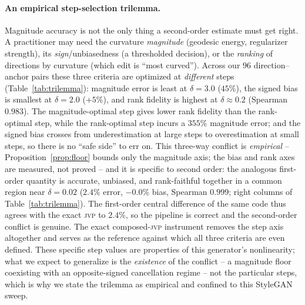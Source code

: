 \documentclass[10pt]{article}
\newcommand{\jvp}{\textsc{jvp}}
\begin{document}
\paragraph{An empirical step-selection trilemma.} Magnitude accuracy is not the only thing a
second-order estimate must get right. A practitioner may need the curvature \emph{magnitude} (geodesic
energy, regularizer strength), its \emph{sign}/unbiasedness (a thresholded decision), or the
\emph{ranking} of directions by curvature (which edit is ``most curved''). Across our $96$
direction--anchor pairs these three criteria are optimized at \emph{different} steps
(Table~\ref{tab:trilemma}): magnitude error is least at $\delta=3.0$ ($45\%$), the signed bias is
smallest at $\delta=2.0$ ($+5\%$), and rank fidelity is highest at $\delta\approx0.2$ (Spearman $0.983$).
The magnitude-optimal step gives lower rank fidelity than the rank-optimal step, while the rank-optimal
step incurs a $355\%$ magnitude error; and the signed bias crosses from underestimation at large steps to
overestimation at small steps, so there is no ``safe side'' to err on. This three-way conflict is
\emph{empirical} -- Proposition~\ref{prop:floor} bounds only the magnitude axis; the bias and rank axes
are measured, not proved -- and it is specific to second order: the analogous first-order quantity is
accurate, unbiased, and rank-faithful together in a common region near $\delta=0.02$ ($2.4\%$ error,
$-0.0\%$ bias, Spearman $0.999$; right columns of Table~\ref{tab:trilemma}). The first-order central
difference of the same code thus agrees with the exact \jvp{} to $2.4\%$, so the pipeline is correct and
the second-order conflict is genuine. The exact composed-\jvp{} instrument removes the step axis
altogether and serves as the reference against which all three criteria are even defined. These specific
step values are properties of this generator's nonlinearity; what we expect to generalize is the
\emph{existence} of the conflict -- a magnitude floor coexisting with an opposite-signed cancellation
regime -- not the particular steps, which is why we state the trilemma as empirical and confined to this
StyleGAN sweep.
\end{document}
